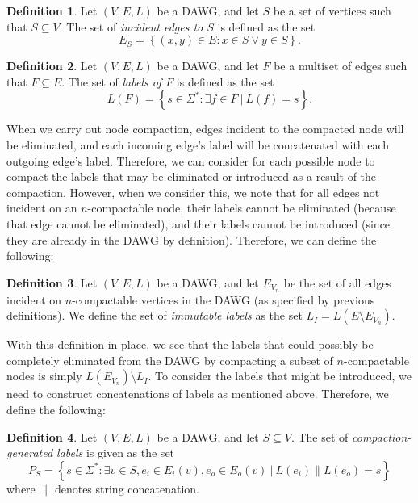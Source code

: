 \documentclass{article}
\newcommand{\emxs}[1]{\ensuremath{#1}\xspace}
\newcommand{\alphabet}{\emxs{\Sigma}}
\newcommand{\edges}{\emxs{E}}
\newcommand{\immutlabels}{\emxs{L_I}}
\newcommand{\labelfunc}{\emxs{L}}
\newcommand{\vertices}{\emxs{V}}
\newcommand{\strings}{\emxs{\alphabet^*}}
\theoremstyle{definition}
\newtheorem{definition}{Definition}
\begin{document}
\begin{definition}
  Let $(\vertices, \edges, \labelfunc)$ be a DAWG, and let $S$ be a set of
  vertices such that $S \subseteq \vertices$. The set of \emph{incident edges to
  $S$} is defined as the set
  \[
    \edges_S = \left\{ (x, y) \in \edges: x \in S \lor y \in S \right\}.
  \]
\end{definition}

\begin{definition}
  Let $(\vertices, \edges, \labelfunc)$ be a DAWG, and let $F$ be a multiset of
  edges such that $F \subseteq \edges$. The set of \emph{labels of $F$} is
  defined as the set
  \[
    \labelfunc(F) = \left\{ s \in \strings: \exists f \in F\ |\ \labelfunc(f) = s
    \right\}.
  \]
\end{definition}

When we carry out node compaction, edges incident to the compacted node will be
eliminated, and each incoming edge's label will be concatenated with each
outgoing edge's label. Therefore, we can consider for each possible node to
compact the labels that may be eliminated or introduced as a result of the
compaction. However, when we consider this, we note that for all edges not
incident on an $n$-compactable node, their labels cannot be eliminated (because
that edge cannot be eliminated), and their labels cannot be introduced (since
they are already in the DAWG by definition). Therefore, we can define the
following:

\begin{definition}
  Let $(\vertices, \edges, \labelfunc)$ be a DAWG, and let
  $\edges_{\vertices_n}$ be the set of all edges incident on $n$-compactable
  vertices in the DAWG (as specified by previous definitions). We define the set
  of \emph{immutable labels} as the set $\immutlabels = \labelfunc(\edges
  \setminus \edges_{\vertices_n})$.
\end{definition}

With this definition in place, we see that the labels that could possibly be
completely eliminated from the DAWG by compacting a subset of $n$-compactable
nodes is simply $\labelfunc(\edges_{\vertices_n}) \setminus \immutlabels$.
To consider the labels that might be introduced, we need to construct
concatenations of labels as mentioned above. Therefore, we define the following:

\begin{definition}
  Let $(\vertices, \edges, \labelfunc)$ be a DAWG, and let $S \subseteq
  \vertices$. The set of
  \emph{compaction-generated labels} is given as the set
  \[
    P_S = \left\{ s \in \strings: \exists v \in S, e_i \in \edges_i(v), e_o \in
    \edges_o(v)\ |\  \labelfunc(e_i) \| \labelfunc(e_o) = s \right\}
  \]
  where $\|$ denotes string concatenation.
\end{definition}
\end{document}

